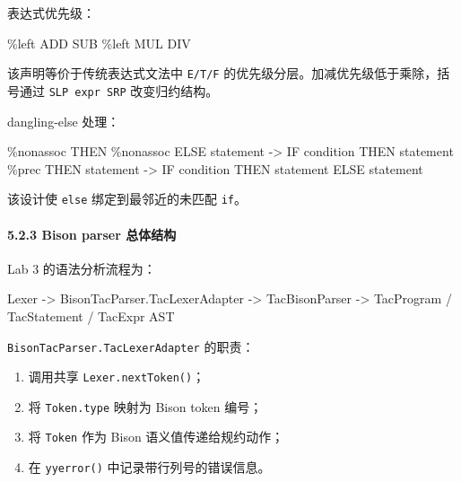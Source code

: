 \documentclass[
  a4paper,
  fontset=none,
]{ctexart}
\newenvironment{Shaded}{}{}
\newcommand{\NormalTok}[1]{#1}
\providecommand{\tightlist}{%
  \setlength{\itemsep}{0pt}\setlength{\parskip}{0pt}}
\begin{document}
表达式优先级：

\begin{Shaded}
\begin{Highlighting}[]
\NormalTok{\%left ADD SUB}
\NormalTok{\%left MUL DIV}
\end{Highlighting}
\end{Shaded}

该声明等价于传统表达式文法中 \texttt{E/T/F}
的优先级分层。加减优先级低于乘除，括号通过 \texttt{SLP\ expr\ SRP}
改变归约结构。

dangling-else 处理：

\begin{Shaded}
\begin{Highlighting}[]
\NormalTok{\%nonassoc THEN}
\NormalTok{\%nonassoc ELSE}
\NormalTok{statement {-}\textgreater{} IF condition THEN statement \%prec THEN}
\NormalTok{statement {-}\textgreater{} IF condition THEN statement ELSE statement}
\end{Highlighting}
\end{Shaded}

该设计使 \texttt{else} 绑定到最邻近的未匹配 \texttt{if}。

\hypertarget{bison-parser-ux603bux4f53ux7ed3ux6784}{%
\paragraph{5.2.3 Bison parser
总体结构}\label{bison-parser-ux603bux4f53ux7ed3ux6784}}

Lab 3 的语法分析流程为：

\begin{Shaded}
\begin{Highlighting}[]
\NormalTok{Lexer}
\NormalTok{  {-}\textgreater{} BisonTacParser.TacLexerAdapter}
\NormalTok{  {-}\textgreater{} TacBisonParser}
\NormalTok{  {-}\textgreater{} TacProgram / TacStatement / TacExpr AST}
\end{Highlighting}
\end{Shaded}

\texttt{BisonTacParser.TacLexerAdapter} 的职责：

\begin{enumerate}
\def\labelenumi{\arabic{enumi}.}
\tightlist
\item
  调用共享 \texttt{Lexer.nextToken()}；
\item
  将 \texttt{Token.type} 映射为 Bison token 编号；
\item
  将 \texttt{Token} 作为 Bison 语义值传递给规约动作；
\item
  在 \texttt{yyerror()} 中记录带行列号的错误信息。
\end{enumerate}
\end{document}
